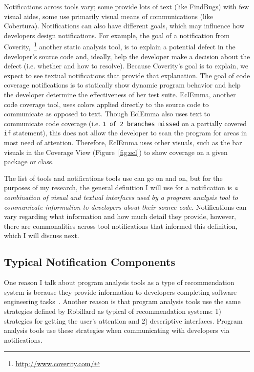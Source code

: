 Notifications across tools vary; some provide lots of text (like FindBugs) with few visual aides, some use primarily visual means of communications (like Cobertura). Notifications can also have different goals, which may influence how developers design notifications. For example, the goal of a notification from Coverity,~\footnote{\url{http://www.coverity.com/}} another static analysis tool, is to explain a potential defect in the developer's source code and, ideally, help the developer make a decision about the defect (i.e. whether and how to resolve). Because Coverity's goal is to explain, we expect to see textual notifications that provide that explanation.
The goal of code coverage notifications is to statically show dynamic program behavior and help the developer determine the effectiveness of her test suite. EclEmma, another code coverage tool, uses colors applied directly to the source code to communicate as opposed to text. Though EclEmma also uses text to communicate code coverage (i.e. \texttt{1 of 2 branches missed} on a partially covered \texttt{if} statement), this does not allow the developer to scan the program for areas in most need of attention. Therefore, EclEmma uses other visuals, such as the bar visuals in the Coverage View (Figure~\ref{fig:ecl}) to show coverage on a given package or class.

The list of tools and notifications tools use can go on and on, but for the purposes of my research, the general definition I will use for a notification is \emph{a combination of visual and textual interfaces used by a program analysis tool to communicate information to developers about their source code.} Notifications can vary regarding what information and how much detail they provide, however, there are commonalities across tool notifications that informed this definition, which I will discuss next.

\subsection{Typical Notification Components}
One reason I talk about program analysis tools as a type of recommendation system is because they provide information to developers completing software engineering tasks~\cite{robillard2014recommendation}. 
Another reason is that program analysis tools use the same strategies defined by Robillard as typical of recommendation systems: 1) strategies for getting the user's attention and 2) descriptive interfaces.
Program analysis tools use these strategies when communicating with developers via notifications.

